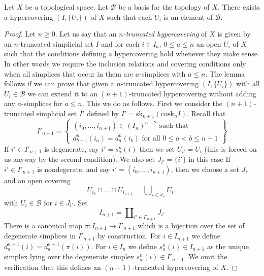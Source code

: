 \begin{lemma}
\label{lemma-basis-hypercovering}
Let $X$ be a topological space.
Let $\mathcal{B}$ be a basis for the topology of $X$.
There exists a hypercovering $(I, \{U_i\})$ of $X$
such that each $U_i$ is an element of $\mathcal{B}$.
\end{lemma}

\begin{proof}
Let $n \geq 0$.
Let us say that an {\it $n$-truncated hypercovering} of $X$ is
given by an $n$-truncated simplicial set $I$ and for each
$i \in I_a$, $0 \leq a \leq n$ an open $U_i$ of $X$ such that
the conditions defining a hypercovering hold whenever they make sense.
In other words we require the inclusion relations and covering
conditions only when all simplices that occur in them
are $a$-simplices with $a \leq n$. The lemma follows if we can prove
that given a $n$-truncated hypercovering $(I, \{U_i\})$ with
all $U_i \in \mathcal{B}$ we can extend it to an $(n + 1)$-truncated
hypercovering without adding any $a$-simplices for $a \leq n$.
This we do as follows. First we consider the $(n + 1)$-truncated
simplicial set $I'$ defined by
$I' = \text{sk}_{n + 1}(\text{cosk}_n I)$.
Recall that
$$
I'_{n + 1} =
\left\{
\begin{matrix}
(i_0, \ldots, i_{n + 1}) \in (I_n)^{n + 2} \text{ such that}\\
d^n_{b - 1}(i_a) = d^n_a(i_b) \text{ for all }0\leq a < b\leq n + 1
\end{matrix}
\right\}
$$
If $i' \in I'_{n + 1}$ is degenerate, say $i' = s^n_a(i)$ then we set
$U_{i'} = U_i$ (this is forced on us anyway by the second condition).
We also set $J_{i'} = \{i'\}$ in this case
If $i' \in I'_{n + 1}$ is nondegerate, and say
$i' = (i_0, \ldots, i_{n + 1})$, then we choose a set
$J_{i'}$ and an open covering
$$
U_{i_0} \cap \ldots \cap U_{i_{n + 1}} =
\bigcup\nolimits_{i \in J_{i'}} U_i,
$$
with $U_i \in \mathcal{B}$ for $i \in J_{i'}$.
Set
$$
I_{n + 1} = \coprod\nolimits_{i' \in I'_{n + 1}} J_{i'}
$$
There is a canonical map $\pi : I_{n + 1} \to I'_{n + 1}$ which is
a bijection over the set of degenerate simplices in $I'_{n + 1}$ by
construction.
For $i \in I_{n + 1}$ we define $d^{n + 1}_a(i) = d^{n + 1}_a(\pi(i))$.
For $i \in I_n$ we define $s^n_a(i) \in I_{n + 1}$ as the unique
simplex lying over the degenerate simplex $s^n_a(i) \in I'_{n + 1}$.
We omit the verification that this defines an $(n + 1)$-truncated
hypercovering of $X$.
\end{proof}


